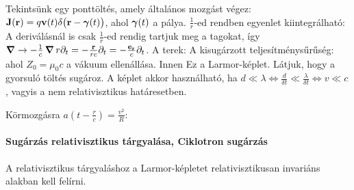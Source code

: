     Tekintsünk egy ponttöltés, amely  általános mozgást végez: $\mathbf{J}(\mathbf{r})=q\mathbf{v}(t)\delta\big(\mathbf{r}-\boldsymbol{\gamma}(t)\big)$, ahol $\boldsymbol{\gamma}(t)$ a pálya. $\frac{1}{r}$-ed rendben  egyenlet kiintegrálható:
    A deriválásnál is csak $\frac{1}{r}$-ed rendig tartjuk meg a tagokat, így $\boldsymbol{\nabla}\to-\frac{1}{c}\mathop{\boldsymbol{\nabla}}\nolimits{r}\partial_t=-\frac{\mathbf{r}}{rc}\partial_t=-\frac{\mathbf{e}_{\mathbf{r}}}{c}\partial_t$. A terek:
    A kisugárzott teljesítménysűrűség:
    ahol $Z_0=\mu_0 c$ a vákuum ellenállása. Innen
    Ez a Larmor-képlet. Látjuk, hogy a gyorsuló töltés sugároz. A képlet akkor használható, ha $d\ll \lambda\Leftrightarrow \frac{d}{\delta t}\ll \frac{\lambda}{\delta t}\Leftrightarrow v\ll c$, vagyis a nem relativisztikus határesetben.
    
    Körmozgásra $a\left(t-\frac{r}{c}\right)=\frac{v^2}{R}$:
    
   \paragraph{Sugárzás relativisztikus tárgyalása, Ciklotron sugárzás} 
    
    A relativisztikus tárgyaláshoz a Larmor-képletet relativisztikusan invariáns alakban kell felírni.
     
